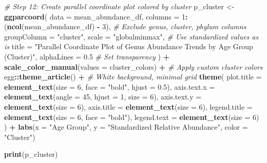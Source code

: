 \documentclass[
]{article}
\newenvironment{Shaded}{\begin{snugshade}}{\end{snugshade}}
\newcommand{\AttributeTok}[1]{\textcolor[rgb]{0.13,0.29,0.53}{#1}}
\newcommand{\CommentTok}[1]{\textcolor[rgb]{0.56,0.35,0.01}{\textit{#1}}}
\newcommand{\DecValTok}[1]{\textcolor[rgb]{0.00,0.00,0.81}{#1}}
\newcommand{\FloatTok}[1]{\textcolor[rgb]{0.00,0.00,0.81}{#1}}
\newcommand{\FunctionTok}[1]{\textcolor[rgb]{0.13,0.29,0.53}{\textbf{#1}}}
\newcommand{\NormalTok}[1]{#1}
\newcommand{\OtherTok}[1]{\textcolor[rgb]{0.56,0.35,0.01}{#1}}
\newcommand{\SpecialCharTok}[1]{\textcolor[rgb]{0.81,0.36,0.00}{\textbf{#1}}}
\newcommand{\StringTok}[1]{\textcolor[rgb]{0.31,0.60,0.02}{#1}}
\begin{document}
\begin{Shaded}
\begin{Highlighting}[]
\CommentTok{\# Step 12: Create parallel coordinate plot colored by cluster}
\NormalTok{p\_cluster }\OtherTok{\textless{}{-}} \FunctionTok{ggparcoord}\NormalTok{(}
  \AttributeTok{data =}\NormalTok{ mean\_abundance\_df,}
  \AttributeTok{columns =} \DecValTok{1}\SpecialCharTok{:}\NormalTok{(}\FunctionTok{ncol}\NormalTok{(mean\_abundance\_df) }\SpecialCharTok{{-}} \DecValTok{3}\NormalTok{),  }\CommentTok{\# Exclude genus, cluster, phylum columns}
  \AttributeTok{groupColumn =} \StringTok{"cluster"}\NormalTok{,}
  \AttributeTok{scale =} \StringTok{"globalminmax"}\NormalTok{,  }\CommentTok{\# Use standardized values as is}
  \AttributeTok{title =} \StringTok{"Parallel Coordinate Plot of Genus Abundance Trends by Age Group (Cluster)"}\NormalTok{,}
  \AttributeTok{alphaLines =} \FloatTok{0.5}  \CommentTok{\# Set transparency}
\NormalTok{) }\SpecialCharTok{+}
  \FunctionTok{scale\_color\_manual}\NormalTok{(}\AttributeTok{values =}\NormalTok{ cluster\_colors) }\SpecialCharTok{+}  \CommentTok{\# Apply custom cluster colors}
\NormalTok{  egg}\SpecialCharTok{::}\FunctionTok{theme\_article}\NormalTok{() }\SpecialCharTok{+}  \CommentTok{\# White background, minimal grid}
  \FunctionTok{theme}\NormalTok{(}
    \AttributeTok{plot.title =} \FunctionTok{element\_text}\NormalTok{(}\AttributeTok{size =} \DecValTok{6}\NormalTok{, }\AttributeTok{face =} \StringTok{"bold"}\NormalTok{, }\AttributeTok{hjust =} \FloatTok{0.5}\NormalTok{),}
    \AttributeTok{axis.text.x =} \FunctionTok{element\_text}\NormalTok{(}\AttributeTok{angle =} \DecValTok{45}\NormalTok{, }\AttributeTok{hjust =} \DecValTok{1}\NormalTok{, }\AttributeTok{size =} \DecValTok{6}\NormalTok{),}
    \AttributeTok{axis.text.y =} \FunctionTok{element\_text}\NormalTok{(}\AttributeTok{size =} \DecValTok{6}\NormalTok{),}
    \AttributeTok{axis.title =} \FunctionTok{element\_text}\NormalTok{(}\AttributeTok{size =} \DecValTok{6}\NormalTok{),}
    \AttributeTok{legend.title =} \FunctionTok{element\_text}\NormalTok{(}\AttributeTok{size =} \DecValTok{6}\NormalTok{, }\AttributeTok{face =} \StringTok{"bold"}\NormalTok{),}
    \AttributeTok{legend.text =} \FunctionTok{element\_text}\NormalTok{(}\AttributeTok{size =} \DecValTok{6}\NormalTok{)}
\NormalTok{  ) }\SpecialCharTok{+}
  \FunctionTok{labs}\NormalTok{(}\AttributeTok{x =} \StringTok{"Age Group"}\NormalTok{, }\AttributeTok{y =} \StringTok{"Standardized Relative Abundance"}\NormalTok{, }\AttributeTok{color =} \StringTok{"Cluster"}\NormalTok{)}

\FunctionTok{print}\NormalTok{(p\_cluster)}
\end{Highlighting}
\end{Shaded}
\end{document}
